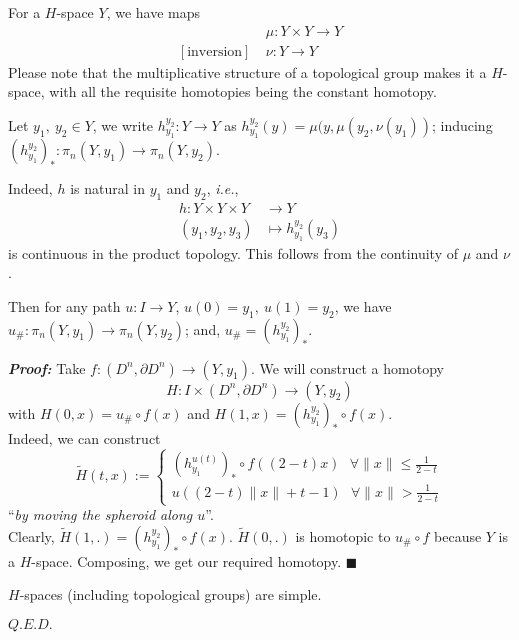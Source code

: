 \documentclass[11pt]{article}
\numberwithin{equation}{section}
\begin{document}
For a $H$-space $Y$, we have maps 
\begin{align*}
[\text{multiplication}]&\ \mu:Y\times Y\rightarrow Y \\ [\text{inversion}]&\ \nu: Y\rightarrow Y
\end{align*}
Please note that the multiplicative structure of a topological group makes it a $H$-space, with all the requisite homotopies being the constant homotopy. 
\begin{defn}
	Let $y_1,\ y_2\in Y$, we write 
	$h_{y_1}^{y_2}:Y\rightarrow Y$ as $h_{y_1}^{y_2}(y)=\mu(y,\mu(y_2,\nu(y_1))$; 
	inducing $\left(h_{y_1}^{y_2}\right)_{*}:\pi_n(Y,y_1)\rightarrow \pi_n(Y,y_2)$. 
\end{defn} 
\begin{rem}
	Indeed, $h$ is natural in $y_1$ and $y_2$, \emph{i.e.}, 
	\begin{align*}
		h:Y\times Y\times Y& \rightarrow Y\\ (y_1,y_2,y_3)&\mapsto h_{y_1}^{y_2}(y_3)
	\end{align*} 
	is continuous in the product topology. 
	This follows from the continuity of $\mu$ and $\nu$.  
\end{rem}
\begin{thm}
	Then for any path $u:I\rightarrow Y$, $u(0)=y_1,\ u(1)=y_2$, 
	we have $u_{\#}:\pi_n(Y,y_1)\rightarrow \pi_n(Y,y_2)$; 
	and, $u_{\#}=\left(h_{y_1}^{y_2}\right)_{*}$.
\end{thm}
\textbf{\emph{Proof:}} Take $f:(D^n,\partial D^n)\rightarrow (Y,y_1)$. 
We will construct a homotopy
$$H:I\times(D^n,\partial D^n)\rightarrow (Y,y_2)$$
with $H(0,x)=u_{\#}\circ f(x)$ and $H(1,x) =\left(h_{y_1}^{y_2}\right)_{*}\circ f(x)$. \\[8pt]
Indeed, we can construct
$$\tilde{H}(t,x):=
\begin{cases}
\left(h_{y_1}^{u(t)}\right)_{*}\circ f((2-t)x)\ \ \ \forall \lVert x\rVert \leqslant \frac{1}{2-t} \\
u\left((2-t)\lVert x\rVert+t-1\right)\ \ \ \forall \lVert x\rVert > \frac{1}{2-t}
\end{cases}$$
``\emph{by moving the spheroid along $u$}''.\\[8pt]
Clearly, $\tilde{H}(1,.)=\left(h_{y_1}^{y_2}\right)_{*}\circ f(x)$. $\tilde{H}(0,.)$ is homotopic to $u_{\#}\circ f$ because $Y$ is a $H$-space. Composing, we get our required homotopy. $\blacksquare$ 
\begin{cor}
	$H$-spaces (including topological groups) are simple. 
\end{cor}
$Q.E.D.$
\end{document}
